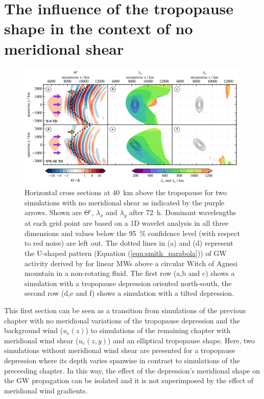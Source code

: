 \section{The influence of the tropopause shape in the context of no meridional shear}
\label{sec:3D_noshear}
\begin{figure}[t]
    \centering
    \includegraphics[width=0.99\textwidth]{figures_3D/waveletAna_overview_noShear.png}
    \caption{Horizontal cross sections at \SI{40}{\kilo\meter} above the tropopause for two simulations with no meridional shear as indicated by the purple arrows. Shown are $\Theta$', $\lambda_x$ and $\lambda_y$ after \SI{72}{\hour}. Dominant wavelengths at each grid point are based on a 1D wavelet analysis in all three dimensions and values below the \SI{95}{\percent} confidence level (with respect to red noise) are left out. The dotted lines in (a) and (d) represent the U-shaped pattern (Equation (\ref{equ:smith_parabola})) of GW activity derived by \textcite[]{smith_linear_1980} for linear MWs above a circular Witch of Agnesi mountain in a non-rotating fluid. The first row (a,b and c) shows a simulation with a tropopause depression oriented north-south, the second row (d,e and f) shows a simulation with a tilted depression.}
    \label{fig:waveletAna_noShear}
\end{figure}
This first section can be seen as a transition from simulations of the previous chapter with no meridional variations of the tropopause depression and the background wind ($u_e(z)$) to simulations of the remaining chapter with meridional wind shear ($u_e(z,y)$) and an elliptical tropopause shape. Here, two simulations without meridional wind shear are presented for a tropopause depression where its depth varies spanwise in contrast to simulations of the preceeding chapter. In this way, the effect of the depression's meridional shape on the GW propagation can be isolated and it is not superimposed by the effect of meridional wind gradients.

